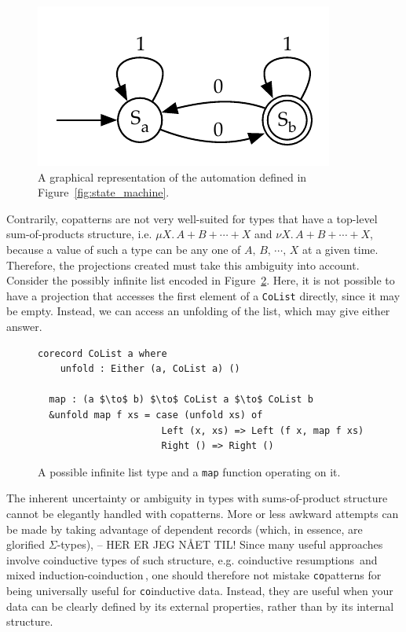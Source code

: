 \begin{figure}[h]
\centering
\includegraphics{figures/dfa}
\caption{A graphical representation of the automation defined in
  Figure~\ref{fig:state_machine}.}
\label{fig:state_machine_graphical}
\end{figure}

Contrarily, copatterns are not very well-suited for types that have a
top-level sum-of-products structure, i.e. ${\mu X.\,A + B + \cdots + X}$ and
${\nu X.\,A + B + \cdots + X}$, because a value of such a type can be any one of
$A,\,B,\,\cdots,\,X$ at a given time. Therefore, the projections created must
take this ambiguity into account. Consider the possibly infinite list encoded
in Figure~\ref{fig:colist}. Here, it is not possible to have a projection that
accesses the first element of a \texttt{CoList} directly, since it may be
empty. Instead, we can access an unfolding of the list, which may give either
answer. 

\begin{figure}[h]
\begin{lstlisting}[mathescape]
  corecord CoList a where
    unfold : Either (a, CoList a) ()

  map : (a $\to$ b) $\to$ CoList a $\to$ CoList b 
  &unfold map f xs = case (unfold xs) of
                      Left (x, xs) => Left (f x, map f xs)
                      Right () => Right ()
\end{lstlisting}
  \caption{A possible infinite list type and a \texttt{map} function operating
    on it.}
  \label{fig:colist}
\end{figure}

The inherent uncertainty or ambiguity in types with sums-of-product structure
cannot be elegantly handled with copatterns. More or less awkward attempts can
be made by taking advantage of dependent records (which, in essence, are
glorified $\Sigma$-types), -- HER ER JEG NÅET TIL! Since many useful approaches
involve coinductive types of such structure, e.g. coinductive
resumptions\,\citep{Pirog2014273} and mixed
induction-coinduction\,\citep{Danielsson09mixinginduction}, one should therefore
not mistake \texttt{co}patterns for being universally useful for
\texttt{co}inductive data. Instead, they are useful when your data can be
clearly defined by its external properties, rather than by its internal
structure.

